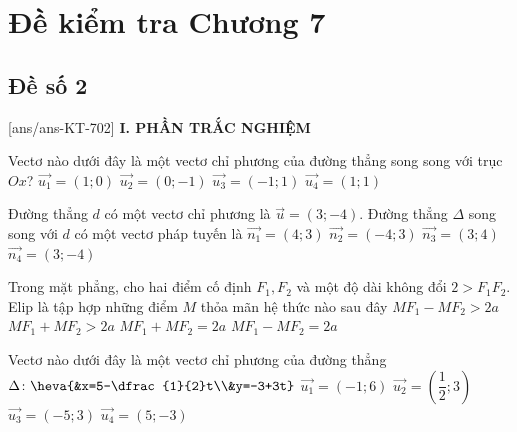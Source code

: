 \section*{Đề kiểm tra Chương 7}
\subsection*{Đề số 2}
\setcounter{ex}{0}\setcounter{bt}{0}
[ans/ans-KT-702]
\noindent\textbf{I. PHẦN TRẮC NGHIỆM}
	\begin{ex}%
	Vectơ nào dưới đây là một vectơ chỉ phương của đường thẳng song song với trục $Ox$?
	\choice
	{\True $\overrightarrow{u_{1}}=(1;0)$}
	{$\overrightarrow{u_{2}}=(0;-1)$}
	{$\overrightarrow{u_{3}}=(-1;1)$}
	{$\overrightarrow{u_{4}}=(1;1)$}
\end{ex}
	\begin{ex}%
	Đường thẳng $d$ có một vectơ chỉ phương là $\overrightarrow{u}=(3;-4)$. Đường thẳng $\Delta$ song song với $d$ có một vectơ pháp tuyến là
	\choice
	{\True $\overrightarrow{n_{1}}=(4;3)$}
	{$\overrightarrow{n_{2}}=(-4;3)$}
	{$\overrightarrow{n_{3}}=(3;4)$}
	{$\overrightarrow{n_{4}}=(3;-4)$}
\end{ex}	
	\begin{ex}%
		Trong mặt phẳng, cho hai điểm cố định $F_1, F_2$ và một độ dài không đổi $2>F_1F_2$. Elip là tập hợp những điểm $M$ thỏa mãn hệ thức nào sau đây
		\choice
		{$MF_1-MF_2>2a$}
		{$MF_1+MF_2>2a$}
		{\True $MF_1+MF_2=2a$}
		{$MF_1-MF_2=2a$}
	\end{ex}
\begin{ex}%
	Vectơ nào dưới đây là một vectơ chỉ phương của đường thẳng $\Delta \colon \heva{&x=5-\dfrac{1}{2}t\\&y=-3+3t}$
	\choice
	{\True $\overrightarrow{u_{1}}=(-1;6)$}
	{$\overrightarrow{u_{2}}=\left(\dfrac{1}{2};3\right)$}
	{$\overrightarrow{u_{3}}=(-5;3)$}
	{$\overrightarrow{u_{4}}=(5;-3)$}
\end{ex}
